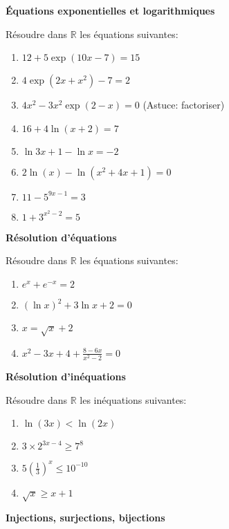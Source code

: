 \documentclass[a4paper,12pt]{article}
\begin{document}


\Exo \textbf{\'Equations exponentielles et logarithmiques}

Résoudre dans $\mathbb{R}$ les équations suivantes:
\begin{enumerate}
\item $12 + 5\exp(10x - 7) = 15$
\item $4\exp(2x + x^2) - 7 = 2$
\item $4x^2 - 3x^2\exp(2 - x) = 0$ (Astuce: factoriser)
\item $16 + 4\ln(x + 2) = 7$
\item $\ln{3x+1}  - \ln{x} = -2$
\item $2\ln(x) - \ln(x^2 +4x + 1) = 0$
\item $11 - 5^{9x -1} = 3$
\item $1 + 3^{x^2 - 2} = 5$
\end{enumerate}

\Exo \textbf{Résolution d'équations}

Résoudre dans $\mathbb{R}$ les équations suivantes:
\begin{enumerate}
\item $e^x + e^{-x} = 2$
\item $(\ln{x})^2 + 3\ln{x} + 2 = 0$
\item $x = \sqrt{x} + 2$
\item $x^2 - 3x + 4 + \frac{8 - 6x}{x^2 - 2} = 0$
\end{enumerate}

\Exo \textbf{Résolution d'inéquations}

Résoudre dans $\mathbb{R}$ les inéquations suivantes:
\begin{enumerate}
\item $\ln(3x) < \ln(2x)$
\item $3 \times 2^{3x -4} \geq 7^8$
\item $5 \left( \frac{1}{3} \right)^x \leq 10^{-10}$
\item $\sqrt{x} \geq x + 1$
\end{enumerate}

\Exo \textbf{Injections, surjections, bijections}
\end{document}
